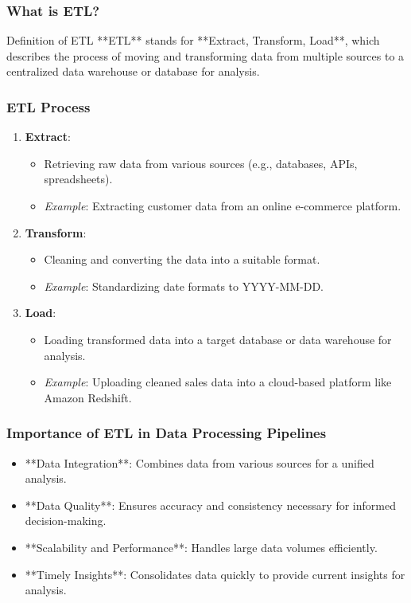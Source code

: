 \documentclass[aspectratio=169]{beamer}
\begin{document}
\begin{frame}[fragile]
    \frametitle{What is ETL?}
    \begin{block}{Definition of ETL}
        **ETL** stands for **Extract, Transform, Load**, which describes the process of moving and transforming data from multiple sources to a centralized data warehouse or database for analysis.
    \end{block}
\end{frame}

\begin{frame}[fragile]
    \frametitle{ETL Process}
    \begin{enumerate}
        \item \textbf{Extract}:
        \begin{itemize}
            \item Retrieving raw data from various sources (e.g., databases, APIs, spreadsheets).
            \item \textit{Example}: Extracting customer data from an online e-commerce platform.
        \end{itemize}

        \item \textbf{Transform}:
        \begin{itemize}
            \item Cleaning and converting the data into a suitable format.
            \item \textit{Example}: Standardizing date formats to YYYY-MM-DD.
        \end{itemize}

        \item \textbf{Load}:
        \begin{itemize}
            \item Loading transformed data into a target database or data warehouse for analysis.
            \item \textit{Example}: Uploading cleaned sales data into a cloud-based platform like Amazon Redshift.
        \end{itemize}
    \end{enumerate}
\end{frame}

\begin{frame}[fragile]
    \frametitle{Importance of ETL in Data Processing Pipelines}
    \begin{itemize}
        \item **Data Integration**: Combines data from various sources for a unified analysis.
        \item **Data Quality**: Ensures accuracy and consistency necessary for informed decision-making.
        \item **Scalability and Performance**: Handles large data volumes efficiently.
        \item **Timely Insights**: Consolidates data quickly to provide current insights for analysis.
    \end{itemize}
\end{frame}
\end{document}
